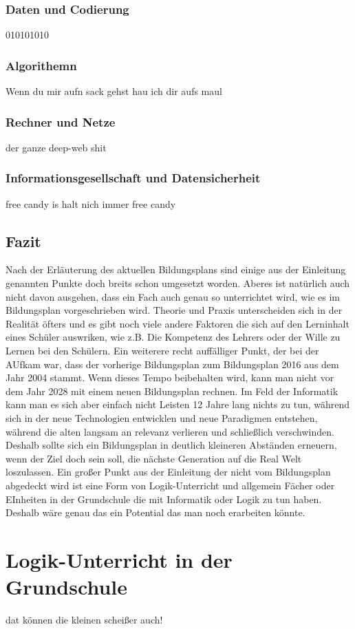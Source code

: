 \subsubsection{Daten und Codierung}
010101010

\subsubsection{Algorithemn}
Wenn du mir aufn sack gehst hau ich dir aufs maul

\subsubsection{Rechner und Netze}
der ganze deep-web shit

\subsubsection{Informationsgesellschaft und Datensicherheit}
free candy is halt nich immer free candy

\subsection{Fazit}
Nach der Erläuterung des aktuellen Bildungsplans sind einige aus der Einleitung genannten Punkte doch breits schon umgesetzt worden. Aberes ist natürlich auch nicht davon ausgehen, dass ein Fach auch genau so unterrichtet wird, wie es im Bildungsplan vorgeschrieben wird. Theorie und Praxis unterscheiden sich in der Realität öfters und es gibt noch viele andere Faktoren die sich auf den Lerninhalt eines Schüler auswriken, wie z.B. Die Kompetenz des Lehrers oder der Wille zu Lernen bei den Schülern. Ein weiterere recht auffälliger Punkt, der bei der AUfkam war, dass der vorherige Bildungsplan zum Bildungsplan 2016 aus dem Jahr 2004 stammt. Wenn dieses Tempo beibehalten wird, kann man nicht vor dem Jahr 2028 mit einem neuen Bildungsplan rechnen. Im Feld der Informatik kann man es sich aber einfach nicht Leisten 12 Jahre lang nichts zu tun, während sich in der neue Technologien entwicklen und neue Paradigmen entstehen, während die alten langsam an relevanz verlieren und schließlich verschwinden. Deshalb sollte sich ein Bildungsplan in deutlich kleineren Abständen erneuern, wenn der Ziel doch sein soll, die nächste Generation auf die Real Welt loszulassen. Ein großer Punkt aus der Einleitung der nicht vom Bildungsplan abgedeckt wird ist eine Form von Logik-Unterricht und allgemein Fächer oder EInheiten in der Grundschule die mit Informatik oder Logik zu tun haben. Deshalb wäre genau das ein Potential das man noch erarbeiten könnte.

\section{Logik-Unterricht in der Grundschule}
dat können die kleinen scheißer auch!